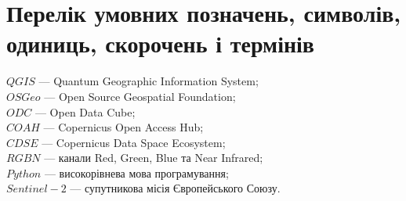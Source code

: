 \chapter*{Перелік умовних позначень, символів, %
одиниць, скорочень і термінів}


\noindent$QGIS$ --- Quantum Geographic Information System;\\ \noindent$OSGeo$ --- Open
Source Geospatial Foundation;\\ \noindent$ODC$ --- Open Data Cube;\\ \noindent$COAH$ ---
Copernicus Open Access Hub;\\ \noindent$CDSE$ --- Copernicus Data Space Ecosystem;\\
\noindent$RGBN$ --- канали Red, Green, Blue та Near Infrared;\\ %
\noindent$Python$ ---
високорівнева мова програмування;\\ \noindent$Sentinel-2$ %
--- супутникова місія
Європейського Союзу.

